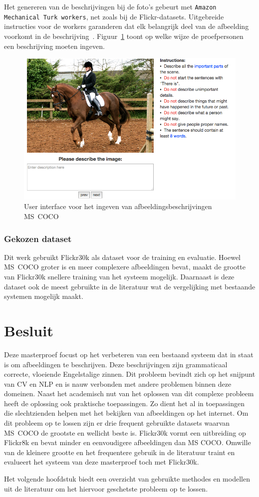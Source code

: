 Het genereren van de beschrijvingen bij de foto's gebeurt met \texttt{Amazon Mechanical Turk workers}, net zoals bij de Flickr-datasets. Uitgebreide instructies voor de workers garanderen dat elk belangrijk deel van de afbeelding voorkomt in de beschrijving~\cite{Rampf2015}. Figuur~\ref{fig:coco_ui} toont op welke wijze de proefpersonen een beschrijving moeten ingeven.

\begin{figure}[tb]
	\centering
	\includegraphics[width=0.8\linewidth]{Images/coco_UI.png}
	\caption{User interface voor het ingeven van afbeeldingsbeschrijvingen \mbox{MS COCO}~\cite{Rampf2015}}
	\label{fig:coco_ui}
\end{figure}
\subsubsection{Gekozen dataset}
Dit werk gebruikt Flickr30k als dataset voor de training en evaluatie. Hoewel \mbox{MS COCO} groter is en meer complexere afbeeldingen bevat, maakt de grootte van Flickr30k snellere training van het systeem mogelijk. Daarnaast is deze dataset ook de meest gebruikte in de literatuur wat de vergelijking met bestaande systemen mogelijk maakt. 

\section{Besluit}
Deze masterproef focust op het verbeteren van een bestaand systeem dat in staat is om afbeeldingen te beschrijven. Deze beschrijvingen zijn grammaticaal correcte, vloeiende Engelstalige zinnen. Dit probleem bevindt zich op het snijpunt van CV en NLP en is nauw verbonden met andere problemen binnen deze domeinen. Naast het academisch nut van het oplossen van dit complexe probleem heeft de oplossing ook praktische toepassingen. Zo dient het al in toepassingen die slechtzienden helpen met het bekijken van afbeeldingen op het internet. Om dit probleem op te lossen zijn er drie frequent gebruikte datasets waarvan \mbox{MS COCO} de grootste en wellicht beste is. Flickr30k vormt een uitbreiding op Flickr8k en bevat minder en eenvoudigere afbeeldingen dan MS COCO. Omwille van de kleinere grootte en het frequentere gebruik in de literatuur traint en evalueert het systeem van deze masterproef toch met Flickr30k. 

Het volgende hoofdstuk biedt een overzicht van gebruikte methodes en modellen uit de literatuur om het hiervoor geschetste probleem op te lossen.
